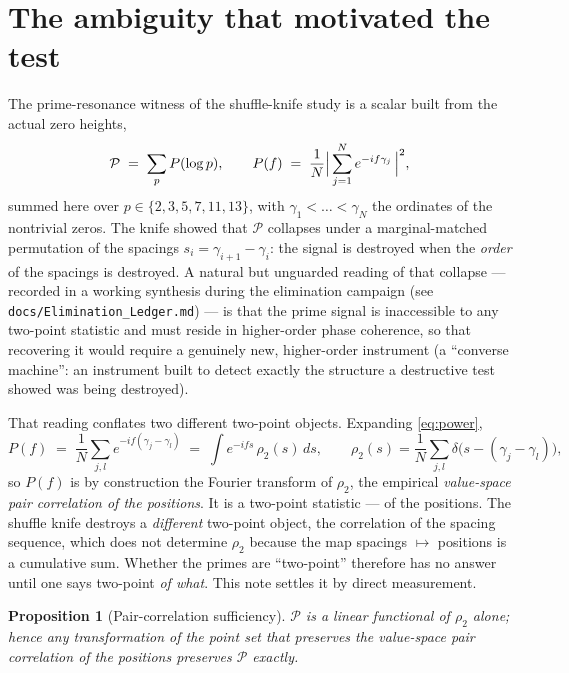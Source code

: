 \documentclass[11pt]{article}
\newtheorem{proposition}{Proposition}
\begin{document}
\section{The ambiguity that motivated the test}\label{sec:motivation}

The prime-resonance witness of the shuffle-knife study is a scalar built from the actual zero heights,
\begin{equation}\label{eq:power}
\mathcal P \;=\; \sum_{p} P(\log p),
\qquad
P(f) \;=\; \frac1N\Bigl\lvert\,\sum_{j=1}^{N} e^{-i f \gamma_j}\,\Bigr\rvert^{2},
\end{equation}
summed here over $p\in\{2,3,5,7,11,13\}$, with $\gamma_1<\dots<\gamma_N$ the ordinates of the nontrivial zeros. The knife showed that $\mathcal P$ collapses under a marginal-matched permutation of the spacings $s_i=\gamma_{i+1}-\gamma_i$: the signal is destroyed when the \emph{order} of the spacings is destroyed. A natural but unguarded reading of that collapse --- recorded in a working synthesis during the elimination campaign (see \nolinkurl{docs/Elimination_Ledger.md}) --- is that the prime signal is inaccessible to any two-point statistic and must reside in higher-order phase coherence, so that recovering it would require a genuinely new, higher-order instrument (a ``converse machine'': an instrument built to detect exactly the structure a destructive test showed was being destroyed).

That reading conflates two different two-point objects. Expanding \eqref{eq:power},
\begin{equation}\label{eq:pair}
P(f) \;=\; \frac1N \sum_{j,l} e^{-i f(\gamma_j-\gamma_l)}
\;=\; \int e^{-i f s}\,\rho_2(s)\,ds,
\qquad
\rho_2(s)=\frac1N\sum_{j,l}\delta\!\bigl(s-(\gamma_j-\gamma_l)\bigr),
\end{equation}
so $P(f)$ is by construction the Fourier transform of $\rho_2$, the empirical \emph{value-space pair correlation of the positions}. It is a two-point statistic --- of the positions. The shuffle knife destroys a \emph{different} two-point object, the correlation of the spacing sequence, which does not determine $\rho_2$ because the map spacings $\mapsto$ positions is a cumulative sum. Whether the primes are ``two-point'' therefore has no answer until one says two-point \emph{of what}. This note settles it by direct measurement.

\begin{proposition}[Pair-correlation sufficiency]\label{prop:suff}
$\mathcal P$ is a linear functional of $\rho_2$ alone; hence any transformation of the point set that preserves the value-space pair correlation of the positions preserves $\mathcal P$ exactly.
\end{proposition}
\end{document}
